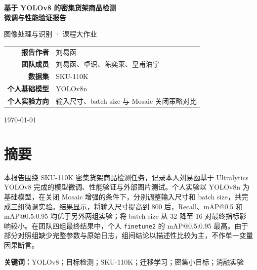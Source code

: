 \documentclass[12pt,a4paper]{ctexart}
\begin{document}
\begin{titlepage}
    \begin{center}
        \vspace*{3cm}

        {\Huge \textbf{基于 YOLOv8 的密集货架商品检测\\[6pt] 微调与性能验证报告}}

        \vspace{2cm}

        {\Large 图像处理与识别 · 课程大作业}

        \vspace{2.5cm}

        {\large
	        \begin{tabular}{rl}
	            \textbf{报告作者} & 刘易函 \\[6pt]
	            \textbf{团队成员} & 刘易函、卓识、陈奕莱、皇甫泊宁 \\[6pt]
	            \textbf{数据集}   & SKU-110K \\[6pt]
	            \textbf{个人基础模型} & YOLOv8n \\[6pt]
	            \textbf{个人实验方向} & 输入尺寸、batch size 与 Mosaic 关闭策略对比
	        \end{tabular}
        }

        \vfill

        {\large \today}
    \end{center}
\end{titlepage}

\newpage
\tableofcontents
\newpage

\section{摘要}

本报告围绕 SKU-110K 密集货架商品检测任务，记录本人刘易函基于 Ultralytics YOLOv8 完成的模型微调、性能验证与外部图片测试。个人实验以 YOLOv8n 为基础模型，在关闭 Mosaic 增强的条件下，分别调整输入尺寸和 batch size，共完成三组微调实验。结果显示，将输入尺寸提高到 800 后，Recall、mAP@0.5 和 mAP@0.5:0.95 均优于另外两组实验；将 batch size 从 32 降至 16 对最终指标影响较小。在团队四组最终结果中，个人 \texttt{finetune2} 的 mAP@0.5:0.95 最高。由于部分对照组缺少完整参数与原始日志，组间结论以描述性比较为主，不作单一变量因果断言。

\medskip
\noindent\textbf{关键词：}YOLOv8；目标检测；SKU-110K；迁移学习；密集小目标；消融实验
\end{document}
